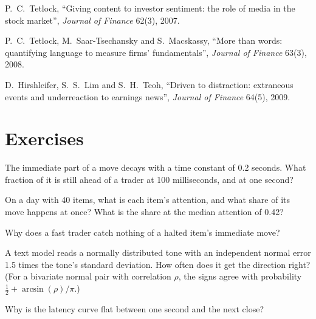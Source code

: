 \begin{omsources}
\item P.~C.~Tetlock, ``Giving content to investor sentiment: the role of media in the stock market'', \emph{Journal of Finance} 62(3), 2007.
\item P.~C.~Tetlock, M.~Saar-Tsechansky and S.~Macskassy, ``More than words: quantifying language to measure firms' fundamentals'', \emph{Journal of
Finance} 63(3), 2008.
\item D.~Hirshleifer, S.~S.~Lim and S.~H.~Teoh, ``Driven to distraction: extraneous events and underreaction to earnings news'', \emph{Journal of
Finance} 64(5), 2009.
\end{omsources}

\section{Exercises}

\begin{exercise}[$\star$]\label{exo:s1:news-and-events:1}
The immediate part of a move decays with a time constant of 0.2 seconds. What fraction of it is still ahead of a trader at 100 milliseconds, and at one
second?
\end{exercise}

\begin{exercise}[$\star$]\label{exo:s1:news-and-events:2}
On a day with 40 items, what is each item's attention, and what share of its move happens at once? What is the share at the median attention of 0.42?
\end{exercise}

\begin{exercise}[$\star$]\label{exo:s1:news-and-events:3}
Why does a fast trader catch nothing of a halted item's immediate move?
\end{exercise}

\begin{exercise}[$\star\star$]\label{exo:s1:news-and-events:4}
A text model reads a normally distributed tone with an independent normal error 1.5 times the tone's standard deviation. How often does it get the
direction right? (For a bivariate normal pair with correlation $\rho$, the signs agree with probability $\tfrac12 + \arcsin(\rho)/\pi$.)
\end{exercise}

\begin{exercise}[$\star\star$]\label{exo:s1:news-and-events:5}
Why is the latency curve flat between one second and the next close?
\end{exercise}

